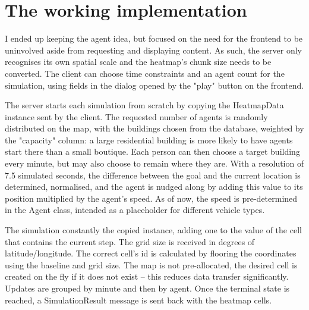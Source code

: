 \label{simulation-working}
\section{The working implementation}

I ended up keeping the agent idea, but focused on the need for the frontend to be uninvolved aside from requesting and displaying content. As such, the server only recognises its own spatial scale and the heatmap's chunk size needs to be converted. The client can choose time constraints and an agent count for the simulation, using fields in the dialog opened by the "play" button on the frontend.

The server starts each simulation from scratch by copying the HeatmapData instance sent by the client. The requested number of agents is randomly distributed on the map, with the buildings chosen from the database, weighted by the "capacity" column: a large residential building is more likely to have agents start there than a small boutique. Each person can then choose a target building every minute, but may also choose to remain where they are. With a resolution of 7.5 simulated seconds, the difference between the goal and the current location is determined, normalised, and the agent is nudged along by adding this value to its position multiplied by the agent's speed. As of now, the speed is pre-determined in the Agent class, intended as a placeholder for different vehicle types.

The simulation constantly the copied instance, adding one to the value of the cell that contains the current step. The grid size is received in degrees of latitude/longitude. The correct cell's id is calculated by flooring the coordinates using the baseline and grid size. The map is not pre-allocated, the desired cell is created on the fly if it does not exist -- this reduces data transfer significantly. Updates are grouped by minute and then by agent. Once the terminal state is reached, a SimulationResult message is sent back with the heatmap cells.

